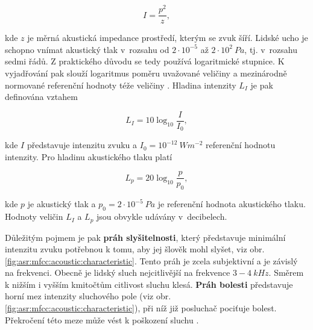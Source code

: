 \begin{equation}
  I = \frac{p^{2}}{z},
  \label{eq:asr:mfcc:intesity}
\end{equation}

\noindent kde $z$ je měrná akustická impedance prostředí, kterým se zvuk šíří. Lidské ucho je schopno vnímat akustický tlak v~rozsahu od $2\cdot10^{-5}$ až $2\cdot10^{2}\ Pa$, tj. v~rozsahu sedmi řádů. Z praktického důvodu se tedy používá logaritmické stupnice. K vyjadřování pak slouží logaritmus poměru uvažované veličiny a mezinárodně normované referenční hodnoty téže veličiny \cite{Psutka2006}. Hladina intenzity $L_{I}$ je pak definována vztahem

\begin{equation}
  L_{I} = 10\log_{10}\frac{I}{I_{0}},
  \label{eq:asr:mfcc:intesity:level}
\end{equation}

\noindent kde $I$ představuje intenzitu zvuku a $I_{0} = 10^{-12}\ Wm^{-2}$ referenční hodnotu intenzity. Pro hladinu akustického tlaku platí

\begin{equation}
  L_{p} = 20\log_{10}\frac{p}{p_{0}},
  \label{eq:asr:mfcc:pressure:level}
\end{equation}

\noindent kde $p$ je akustický tlak a $p_{0} = 2\cdot10^{-5}\ Pa$ je referenční hodnota akustického tlaku. Hodnoty veličin $L_{I}$ a $L_{p}$ jsou obvykle udávány v~decibelech. %

Důležitým pojmem je pak \textbf{práh slyšitelnosti}, který představuje minimální intenzitu zvuku potřebnou k tomu, aby jej šlověk mohl slyšet, viz obr. \ref{fig:asr:mfcc:acoustic:characteristic}. Tento práh je zcela subjektivní a je závislý na frekvenci. Obecně je lidský sluch nejcitlivější na frekvence $3 - 4\ kHz$. Směrem k nižším i vyšším kmitočtům citlivost sluchu klesá. \textbf{Práh bolesti} představuje horní mez intenzity sluchového pole (viz obr. \ref{fig:asr:mfcc:acoustic:characteristic}), při níž již posluchač pociťuje bolest. Překročení této meze může vést k poškození sluchu \cite{Holmes2001}.

